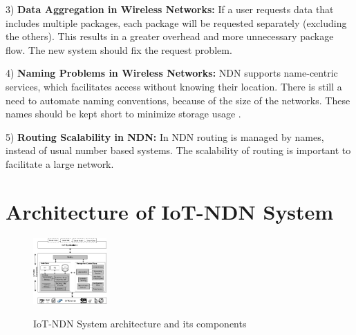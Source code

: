 \documentclass[conference]{IEEEtran}
\begin{document}
  
  
  3) \textbf{Data Aggregation in Wireless Networks:}
  If a user requests data that includes multiple packages, each package will be requested separately (excluding the others). This results in a greater overhead and more unnecessary package flow. The new system should fix the request problem.
  
  4) \textbf{Naming Problems in Wireless Networks:}
  NDN supports name-centric services, which facilitates access without knowing their location. There is still a need to automate naming conventions, because of the size of the networks. These names should be kept short to minimize storage usage \cite{b17}\cite{b18}. 
  
  
  5) \textbf{Routing Scalability in NDN:}
  In NDN routing is managed by names, instead of usual number based systems. The scalability of routing is important to facilitate a large network.
  
  \section{Architecture of IoT-NDN System}
  
  \begin{figure}[h]
      \centering
      \includegraphics[width=0.25\textwidth]{IoT-NDN_System_architecture_and_its_components.png}\\
      \caption{IoT-NDN System architecture and its components}
      \label{fig:enter-label}
  \end{figure}
  
\end{document}
